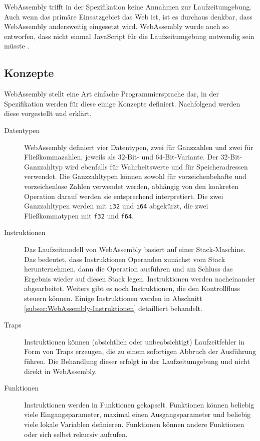 WebAssembly trifft in der Spezifikation keine Annahmen zur Laufzeitumgebung. Auch wenn das primäre Einsatzgebiet das Web ist, ist es durchaus denkbar, dass WebAssembly andersweitig eingesetzt wird. WebAssembly wurde auch so entworfen, dass nicht einmal JavaScript für die Laufzeitumgebung notwendig sein müsste \cite{WebAssemblyWebsite}.

\subsection{Konzepte}
\label{subsec:WebAssembly-Konzepte}
WebAssembly stellt eine Art einfache Programmiersprache dar, in der Spezifikation werden für diese einige Konzepte \cite{WebAssemblySpecification} definiert. Nachfolgend werden diese vorgestellt und erklärt.

\begin{description}
    \item[Datentypen] WebAssembly definiert vier Datentypen, zwei für Ganzzahlen und zwei für Fließkommazahlen, jeweils als 32-Bit- und 64-Bit-Variante. Der 32-Bit-Ganz\-zahl\-typ wird ebenfalls für Wahrheitswerte und für Speicheradressen verwendet. Die Ganzzahltypen können sowohl für vorzeichenbehafte und vorzeichenlose Zahlen verwendet werden, abhängig von den konkreten Operation darauf werden sie entsprechend interpretiert. Die zwei Ganzzahltypen werden mit \lstinline{i32} und \lstinline{i64} abgekürzt, die zwei Fließkommatypen mit \lstinline{f32} und \lstinline{f64}.
    \item[Instruktionen] Das Laufzeitmodell von WebAssembly basiert auf einer Stack-Ma\-schi\-ne. Das bedeutet, dass Instruktionen Operanden zunächst vom Stack herunternehmen, dann die Operation ausführen und am Schluss das Ergebnis wieder auf diesen Stack legen. Instruktionen werden nacheinander abgearbeitet. Weiters gibt es noch Instruktionen, die den Kontrollfluss steuern können. Einige Instruktionen werden in Abschnitt \ref{subsec:WebAssembly-Instruktionen} detailliert behandelt.
    \item[Traps] Instruktionen können (absichtlich oder unbeabsichtigt) Laufzeitfehler in Form von Traps erzeugen, die zu einem sofortigen Abbruch der Ausführung führen. Die Behandlung dieser erfolgt in der Laufzeitumgebung und nicht direkt in WebAssembly.
    \item[Funktionen] Instruktionen werden in Funktionen gekapselt. Funktionen können beliebig viele Eingangsparameter, maximal einen Ausgangsparameter und beliebig viele lokale Variablen definieren. Funktionen können andere Funktionen oder sich selbst rekursiv aufrufen.

\end{description}
